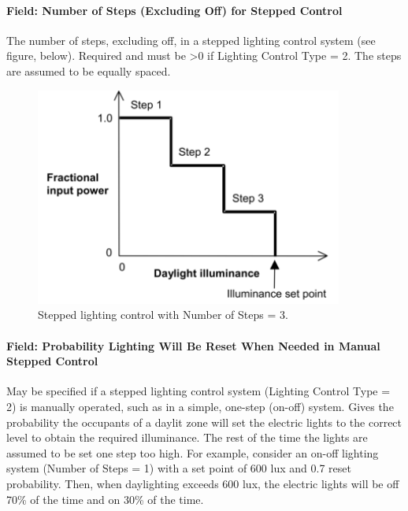 \paragraph{Field: Number of Steps (Excluding Off) for Stepped Control}\label{field-number-of-steps-excluding-off-for-stepped-control}

The number of steps, excluding off, in a stepped lighting control system (see figure, below). Required and must be \textgreater{}0 if Lighting Control Type = 2. The steps are assumed to be equally spaced.

\begin{figure}[hbtp] %
\centering
\includegraphics[width=0.9\textwidth, height=0.9\textheight, keepaspectratio=true]{media/image106.png}
\caption{Stepped lighting control with Number of Steps = 3. \protect \label{fig:stepped-lighting-control-with-number-of-steps-001}}
\end{figure}

\paragraph{Field: Probability Lighting Will Be Reset When Needed in Manual Stepped Control}\label{field-probability-lighting-will-be-reset-when-needed-in-manual-stepped-control-1}

May be specified if a stepped lighting control system (Lighting Control Type = 2) is manually operated, such as in a simple, one-step (on-off) system. Gives the probability the occupants of a daylit zone will set the electric lights to the correct level to obtain the required illuminance. The rest of the time the lights are assumed to be set one step too high. For example, consider an on-off lighting system (Number of Steps = 1) with a set point of 600 lux and 0.7 reset probability. Then, when daylighting exceeds 600 lux, the electric lights will be off 70\% of the time and on 30\% of the time.

